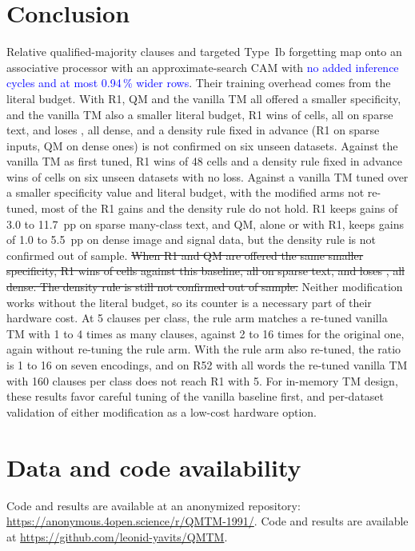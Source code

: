 \documentclass[preprint,12pt,times]{elsarticle}
\newcommand{\proj}[1]{\textcolor{blue}{#1}}
\newcommand{\add}[1]{{\color{blue}#1}}
\newcommand{\hadd}[1]{{\color{harel}#1}}
\newcommand{\hdel}[1]{\textcolor{harel}{\sout{#1}}}
\begin{document}
\section{Conclusion}
\label{sec:conclusion}
Relative qualified-majority clauses and targeted Type~Ib forgetting map onto an associative processor with an approximate-search CAM with \proj{no added inference cycles and at most 0.94\,\% wider rows}. Their training overhead comes from the literal budget.
\hadd{With R1, QM and the vanilla TM all offered a smaller specificity, and the vanilla TM also a smaller literal budget, R1 wins \ctlRbothallW{} of \ctlRbothallN{} cells, all on sparse text, and loses \ctlRbothallL{}, all dense, and a density rule fixed in advance (R1 on sparse inputs, QM on dense ones) is not confirmed on six unseen datasets.}
Against the vanilla TM as first tuned, R1 wins \numRwin{} of 48 cells and a density rule fixed in advance wins \numruleWin{} of \numruleN{} cells on six unseen datasets with no loss.
Against a vanilla TM tuned over a smaller specificity value and literal budget, with the modified arms not re-tuned, most of the R1 gains and the density rule do not hold.
R1 keeps gains of 3.0 to 11.7~pp on sparse many-class text, and QM, alone or with R1, keeps gains of 1.0 to 5.5~pp on dense image and signal data, but the density rule is not confirmed out of sample.
\add{\hdel{When R1 and QM are offered the same smaller specificity, R1 wins \ctlRbothallW{} of \ctlRbothallN{} cells against this baseline, all on sparse text, and loses \ctlRbothallL{}, all dense. The density rule is still not confirmed out of sample.}
Neither modification works without the literal budget, so its counter is a necessary part of their hardware cost.}
At 5 clauses per class, the rule arm matches a re-tuned vanilla TM with 1 to 4 times as many clauses, against 2 to 16 times for the original one, again without re-tuning the rule arm. \add{With the rule arm also re-tuned, the ratio is 1 to 16 on seven encodings, and on R52 with all words the re-tuned vanilla TM with 160 clauses per class does not reach R1 with 5.}
For in-memory TM design, these results favor careful tuning of the vanilla baseline first, and per-dataset validation of either modification as a low-cost hardware option.

\section*{Data and code availability}
\ifdefined\anonymous
Code and results are available at an anonymized repository: \url{https://anonymous.4open.science/r/QMTM-1991/}.
\else
Code and results are available at \url{https://github.com/leonid-yavits/QMTM}.
\fi
\end{document}
